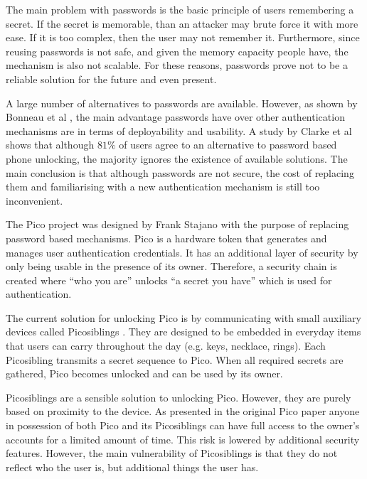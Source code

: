 The main problem with passwords is the basic principle of users remembering a secret. If the secret is memorable, than an attacker may brute force it with more ease. If it is too complex, then the user may not remember it. Furthermore, since reusing passwords is not safe, and given the memory capacity people have, the mechanism is also not scalable. For these reasons, passwords prove not to be a reliable solution for the future and even present.

A large number of alternatives to passwords are available. However, as shown by Bonneau et al \cite{bonneau2012quest}, the main advantage passwords have over other authentication mechanisms are in terms of deployability and usability. A study by Clarke et al \cite{clarke2002acceptance} shows that although $81\%$ of users agree to an alternative to password based phone unlocking, the majority ignores the existence of available solutions. The main conclusion is that although passwords are not secure, the cost of replacing them and familiarising with a new authentication mechanism is still too inconvenient. 

The Pico project was designed by Frank Stajano \cite{stajano2011pico} with the purpose of replacing password based mechanisms. Pico is a hardware token that generates and manages user authentication credentials. It has an additional layer of security by only being usable in the presence of its owner. Therefore, a security chain is created where ``who you are'' unlocks ``a secret you have'' which is used for authentication.

The current solution for unlocking Pico is by communicating with small auxiliary devices called Picosiblings \cite{stannard2012good}. They are designed to be embedded in everyday items that users can carry throughout the day (e.g. keys, necklace, rings). Each Picosibling transmits a secret sequence to Pico. When all required secrets are gathered, Pico becomes unlocked and can be used by its owner.

Picosiblings are a sensible solution to unlocking Pico. However, they are purely based on proximity to the device. As presented in the original Pico paper \cite{stajano2011pico} anyone in possession of both Pico and its Picosiblings can have full access to the owner's accounts for a limited amount of time. This risk is lowered by additional security features. However, the main vulnerability of Picosiblings is that they do not reflect who the user is, but additional things the user has.

